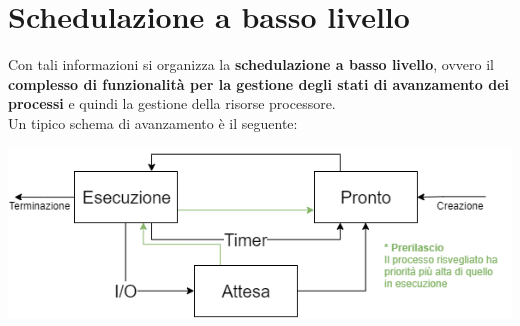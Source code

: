 \documentclass[10pt]{report}
\begin{document}
\section{Schedulazione a basso livello}
Con tali informazioni si organizza la \textbf{schedulazione a basso livello}, ovvero il \textbf{complesso di funzionalità per la gestione degli stati di avanzamento dei processi} e quindi la gestione della risorse processore.\\
Un tipico schema di avanzamento è il seguente:
\begin{center}
\includegraphics[scale=0.8]{processistati.png}
\end{center}
\end{document}

